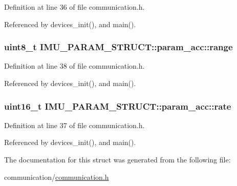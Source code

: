 Definition at line 36 of file communication.\-h.



Referenced by devices\-\_\-init(), and main().

\hypertarget{structIMU__PARAM__STRUCT_1_1param__acc_a26199b298ef2d353192dfbc706bce8cf}{
\subsubsection[{range}]{\setlength{\rightskip}{0pt plus 5cm}uint8\-\_\-t I\-M\-U\-\_\-\-P\-A\-R\-A\-M\-\_\-\-S\-T\-R\-U\-C\-T\-::param\-\_\-acc\-::range}}\label{structIMU__PARAM__STRUCT_1_1param__acc_a26199b298ef2d353192dfbc706bce8cf}


Definition at line 38 of file communication.\-h.



Referenced by devices\-\_\-init(), and main().

\hypertarget{structIMU__PARAM__STRUCT_1_1param__acc_a30e6a318cad098cd8379416705820f95}{
\subsubsection[{rate}]{\setlength{\rightskip}{0pt plus 5cm}uint16\-\_\-t I\-M\-U\-\_\-\-P\-A\-R\-A\-M\-\_\-\-S\-T\-R\-U\-C\-T\-::param\-\_\-acc\-::rate}}\label{structIMU__PARAM__STRUCT_1_1param__acc_a30e6a318cad098cd8379416705820f95}


Definition at line 37 of file communication.\-h.



Referenced by devices\-\_\-init(), and main().



The documentation for this struct was generated from the following file\-:\begin{DoxyCompactItemize}
\item 
communication/\hyperlink{communication_8h}{communication.\-h}\end{DoxyCompactItemize}
